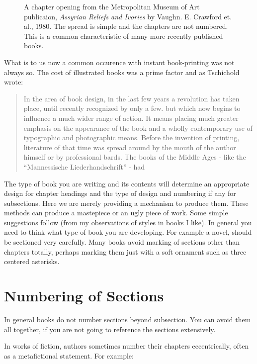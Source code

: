 \begin{figure}[htbp]
\centering
\parindent=0pt
\par
\caption{A chapter opening from the Metropolitan Museum of Art publicaion, \textit{Assyrian Reliefs and Ivories} by Vaughn. E. Crawford et. al., 1980. The spread is simple and the chapters are not numbered. This is a common characteristic of many more recently published books.}
\end{figure}


What is to us now a common occurence with instant book-printing was not always so. The cost of illustrated books was a prime factor and as Tschichold wrote:
\begin{quotation}
In the area of book design, in the last few years a revolution has taken place, until recently recognized by only a few. but which now begins to influence a much wider range of action.
It means placing much greater emphasis on the appearance of the book and a wholly contemporary use of typographic and photographic means. Before the invention of printing, literature of that time was spread around by the mouth of the author himself or by professional bards. The books of the Middle Ages - like the ``Mannessische Liederhandschrift'' - had
\end{quotation}

The type of book you are writing and its contents will determine an appropriate design for chapter headings and the type of design and numbering if any for subsections. Here we are merely providing a mechanism to produce them. These methods can produce a mastepiece or an ugly piece of work. Some simple suggestions follow (from my observations of styles in books I like). In general you need to think what type of book you are developing. For example a novel, should be sectioned very carefully. Many books avoid marking of sections other than chapters totally, perhaps marking them just with a soft ornament such as three centered asterisks.

\section{Numbering of Sections}


In general books do not number sections beyond subsection. You can avoid them all together, if you are not going to reference the sections extensively. 

In works of fiction, authors sometimes number their chapters eccentrically, often as a metafictional statement. For example:

